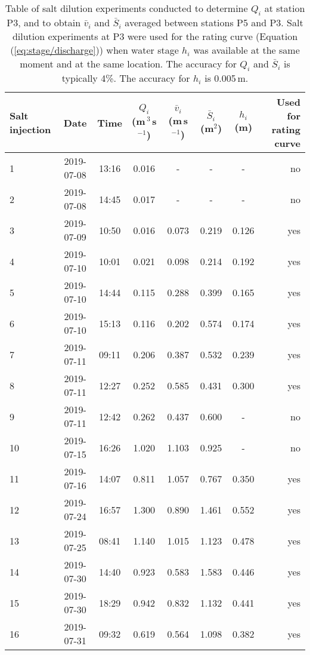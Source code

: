\begin{table}[H]
\centering
\caption{Table of salt dilution experiments conducted to determine $Q_i$ at station P3, and to obtain $\bar v_i$ and $\bar S_i$ averaged between stations P5 and P3. Salt dilution experiments at P3 were used for the rating curve (Equation (\ref{eq:stage/discharge})) when water stage $h_i$ was available at the same moment and at the same location. The accuracy for $Q_i$ and $\bar S_i$ is typically 4\%. The accuracy for $h_i$ is 0.005\,m.}
\begin{tabular}{l c c c c c c r}
\hline
\textbf{Salt injection} & \textbf{Date} & \textbf{Time} & \textbf{$Q_i$ (m\,$^3$\,s$^{-1}$}) & \textbf{$\bar v_i$ (m\,s$^{-1}$)} & \textbf{$\bar S_i$ (m$^2$)} & \textbf{$h_i$ (m)} & \textbf{Used for rating curve}\\
\hline

1 & 2019-07-08 & 13:16 &  0.016  & - & - & - &no\\
2 & 2019-07-08 & 14:45 &  0.017 & - & - & - &no \\
3 & 2019-07-09 & 10:50 &  0.016 & 0.073 & 0.219 & 0.126 &yes\\
4 & 2019-07-10 & 10:01 &  0.021 & 0.098 & 0.214 & 0.192 &yes \\
5 & 2019-07-10 & 14:44 &  0.115 & 0.288 & 0.399 & 0.165 &yes \\
6 & 2019-07-10 & 15:13 & 0.116 & 0.202 & 0.574 & 0.174 &yes\\
7 & 2019-07-11 & 09:11 &  0.206 & 0.387 & 0.532 & 0.239 &yes \\
8 & 2019-07-11 & 12:27 &  0.252 & 0.585 & 0.431 & 0.300 &yes\\
9 & 2019-07-11 & 12:42 &  0.262 & 0.437 & 0.600 & - &no\\
10 & 2019-07-15 & 16:26 &  1.020 & 1.103 & 0.925 & - &no\\
11 & 2019-07-16 & 14:07 &  0.811 & 1.057 & 0.767 & 0.350 &yes \\
12 & 2019-07-24 & 16:57 &  1.300 & 0.890 & 1.461 & 0.552 &yes \\
13 & 2019-07-25 & 08:41 &  1.140 & 1.015 & 1.123 & 0.478 &yes\\
14 & 2019-07-30 & 14:40 &  0.923 & 0.583 & 1.583 & 0.446 &yes \\
15 & 2019-07-30 & 18:29 &  0.942 & 0.832 & 1.132 & 0.441 & yes\\
16 & 2019-07-31 & 09:32 &  0.619 & 0.564 & 1.098 & 0.382 & yes \\

\hline
\end{tabular}
\label{table salt dilution}
\end{table}


